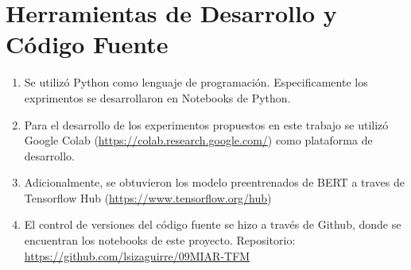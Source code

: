 

\chapter{Herramientas de Desarrollo y Código Fuente}
\label{apendize-a}

\begin{enumerate}
    \item Se utilizó Python como lenguaje de programación. Especificamente los exprimentos se desarrollaron en Notebooks de Python.
    
    \item Para el desarrollo de los experimentos propuestos en este trabajo se utilizó Google Colab (\url{https://colab.research.google.com/}) como plataforma de desarrollo.
    
    \item Adicionalmente, se obtuvieron los modelo preentrenados de BERT a traves de Tensorflow Hub (\url{https://www.tensorflow.org/hub})
    
    \item El control de versiones del código fuente se hizo a través de Github, donde se encuentran los notebooks de este proyecto. Repositorio: \url{https://github.com/lsizaguirre/09MIAR-TFM}
\end{enumerate}